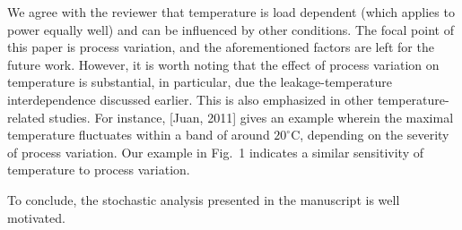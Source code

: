 \begin{authors}
We agree with the reviewer that temperature is load dependent (which applies to power equally well) and can be influenced by other conditions.
The focal point of this paper is process variation, and the aforementioned factors are left for the future work.
However, it is worth noting that the effect of process variation on temperature is substantial, in particular, due the leakage-temperature interdependence discussed earlier.
This is also emphasized in other temperature-related studies.
For instance, [Juan, 2011] gives an example wherein the maximal temperature fluctuates within a band of around $20^\circ$C, depending on the severity of process variation.
Our example in Fig.~1 indicates a similar sensitivity of temperature to process variation.

To conclude, the stochastic analysis presented in the manuscript is well motivated.


\end{authors}

